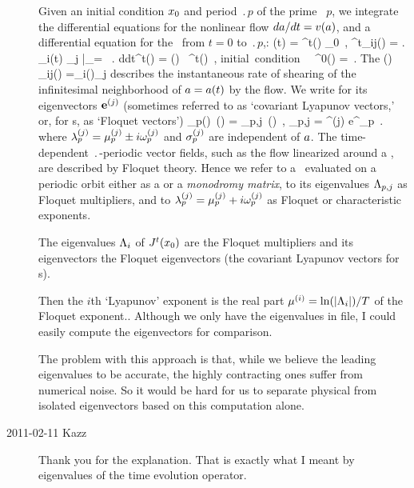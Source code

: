 \begin{description}
Given an initial condition $\xInit$ and period $\period{p}$ of the prime
\po\ $p$, we integrate
the differential equations for the nonlinear flow
$d\ssp/dt=v(\ssp)$, and a differential equation for the \jacobianM\
from $t=0$ to $\period{p}$,:
\beq
    \deltaX(t) = \jMps^t(\xInit) \deltaX_0
    \,, \qquad
\jMps^t_{ij}(\xInit)
  =  \left. {\pde \ssp_i(t) \over \pde \ssp_j} \right|_{\ssp=\xInit}
\, .
\label{hOdes1}
\eeq
\beq
{d\over dt}\jMps^t(\xInit)
    = {\Mvar}(\ssp) \, \jMps^t(\xInit)
\,, \quad
\mbox{initial condition~~} \jMps^0(\xInit) = \matId
\,.
The {\stabmat} (\velgradmat)
\beq
{\Mvar}_{ij}(\ssp) ={\pde \vel_i(\ssp)\over \pde \ssp_j  }
describes the instantaneous rate of shearing of the infinitesimal
neighborhood of $\ssp=\ssp(t)$
by the flow.
We write for its
eigen\-vectors $\jEigvec[j]$
(sometimes referred to as `covariant Lyapunov vectors,'
or, for \po s, as `Floquet vectors')
\beq
\jMps_{p}(\ssp)\, \jEigvec[j](\ssp)
   = \ExpaEig_{p,j} \,\jEigvec[j] (\ssp)
\,,\qquad
\ExpaEig_{p,j}
= ^{(j)} e^{\eigExp[j]_p  }
\,.
where $\eigExp[j]_p = \eigRe[j]_p \pm i\eigIm[j]_p$
and $\sign{p}^{(j)}$ are independent of
$\ssp$.
The time-dependent
$\period{}$-periodic vector fields, such
as the flow linearized around a \po, are
described by Floquet theory. Hence
we refer to a \jacobianM\
evaluated on a periodic orbit either as
a {\em \FloquetM} or a {\em monodromy matrix}, to its
eigenvalues
$\ExpaEig_{p,j}$ as Floquet multipliers,
and to $\eigExp[j]_p = \eigRe[j]_p+i\eigIm[j]_p$ as Floquet or
characteristic exponents.



The eigenvalues $\ExpaEig_i$ of $\jMps^t(\xInit)$ are
the Floquet multipliers and its eigenvectors the Floquet eigenvectors
(the covariant Lyapunov vectors for \po s).

Then the $i$th `Lyapunov' exponent is the real part
$\eigRe[i] = \ln(|\ExpaEig_i|)/ T$ of the Floquet exponent..
Although we only have the eigenvalues in file, I could easily compute
the eigenvectors for comparison.

The problem with this approach is that, while we believe the leading
eigenvalues to be accurate, the highly contracting ones suffer from
numerical noise. So it would be hard for us to separate physical from
isolated eigenvectors based on this computation alone.


\item[2011-02-11 Kazz] Thank you for the explanation. That is exactly what
I meant by eigenvalues of the time evolution operator.


\end{description}
